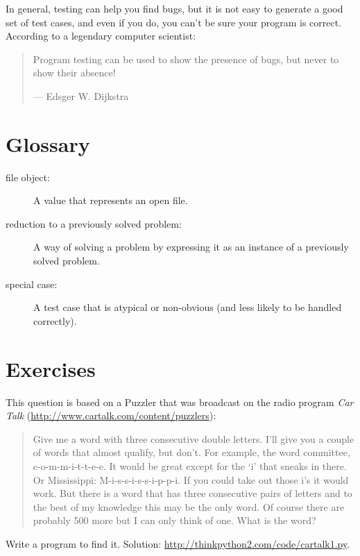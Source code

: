 \documentclass[
DIV=11,
fontsize=13,
twoside,
headinclude=false,
titlepage=firstiscover,
abstract=true,
headsepline=true,
footsepline=true,
chapterprefix=true, %
headings=big,
bibliography=totoc,%
captions=tableheading
]{scrbook}
\theoremstyle{definition}
\begin{document}
In general, testing can help you find bugs, but it is not easy to
generate a good set of test cases, and even if you do, you can't
be sure your program is correct.
According to a legendary computer scientist:

\begin{quote}
Program testing can be used to show the presence of bugs, but never to
show their absence!

--- Edsger W. Dijkstra
\end{quote}


\section{Glossary}

\begin{description}

\item[file object:] A value that represents an open file.

\item[reduction to a previously solved problem:] A way of solving a
  problem by expressing it as an instance of a previously solved
  problem.  

\item[special case:] A test case that is atypical or non-obvious
(and less likely to be handled correctly).

\end{description}


\section{Exercises}

\begin{exercise}
\normalfont
{}

This question is based on a Puzzler that was broadcast on the radio
program {\em Car Talk} 
(\url{http://www.cartalk.com/content/puzzlers}):

\begin{quote}
Give me a word with three consecutive double letters. I'll give you a
couple of words that almost qualify, but don't. For example, the word
committee, c-o-m-m-i-t-t-e-e. It would be great except for the `i' that
sneaks in there. Or Mississippi: M-i-s-s-i-s-s-i-p-p-i. If you could
take out those i's it would work. But there is a word that has three
consecutive pairs of letters and to the best of my knowledge this may
be the only word. Of course there are probably 500 more but I can only
think of one. What is the word?
\end{quote}

Write a program to find it.
Solution: \url{http://thinkpython2.com/code/cartalk1.py}.

\end{exercise}
\end{document}
